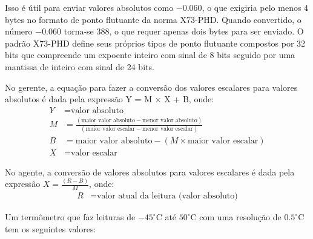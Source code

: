 Isso é útil para enviar valores absolutos como $-0.060$, o que exigiria pelo menos 4 bytes no formato de ponto flutuante da norma X73-PHD. Quando convertido, o número $-0.060$ torna-se 388, o que requer apenas dois bytes para ser enviado. O padrão X73-PHD define seus próprios tipos de ponto flutuante compostos por 32 bits que compreende um expoente inteiro com sinal de 8 bits seguido por uma mantissa de inteiro com sinal de 24 bits.

No gerente, a equação para fazer a conversão dos valores escalares para valores absolutos é dada pela expressão Y = M × X + B, onde:
\begin{align*}
    Y &= \text{valor absoluto}\\
    M &= \frac{(\text{maior valor absoluto} - \text{menor valor absoluto})}{(\text{maior valor escalar} - \text{menor valor escalar})}\\
    B &= \text{maior valor absoluto} - (M \times \text{maior valor escalar})\\
    X &= \text{valor escalar}
\end{align*}

No agente, a conversão de valores absolutos para valores escalares é dada pela expressão $X = \frac{(R - B)}{M}$, onde:
\begin{align*}
   R &= \text{valor atual da leitura (valor absoluto)}
\end{align*}

Um termômetro que faz leituras de $-45^\circ$C até $50^\circ$C com uma resolução de $0.5^\circ$C tem os seguintes valores:

